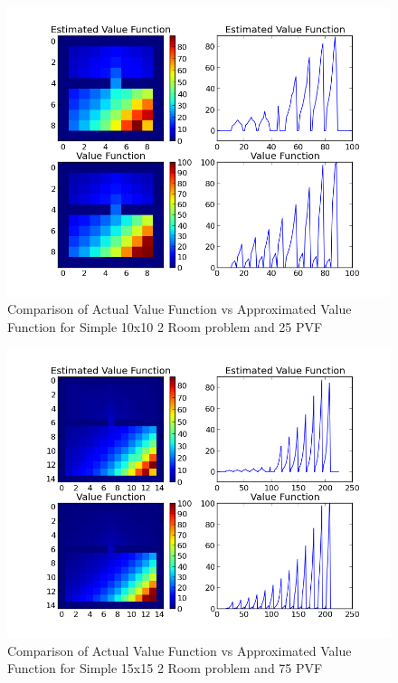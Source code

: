 \documentclass[12pt, letterpaper, final]{report}
\begin{document}
\FloatBarrier
\begin{figure}[h!]
\centering
\includegraphics[scale=.5]{images/paper_example_V_function_comparison_k25_s5000_graph01.png}
\caption{Comparison of Actual Value Function vs Approximated Value
  Function for Simple 10x10 2 Room problem and 25 PVF}
\label{valueVsQ1}
\end{figure}
\FloatBarrier

\FloatBarrier
\begin{figure}[h!]
\centering
\includegraphics[scale=.5]{images/paper_example_big_V_function_comparison_k75_s5000_graph01.png}
\caption{Comparison of Actual Value Function vs Approximated Value
  Function for Simple 15x15 2 Room problem and 75 PVF}
\label{valueVsQ2}
\end{figure}
\FloatBarrier
\end{document}
